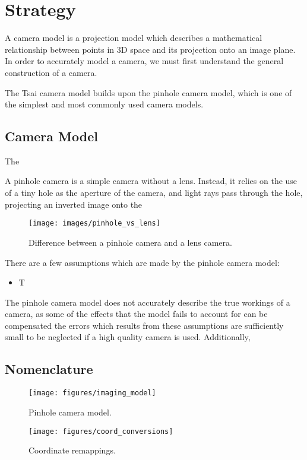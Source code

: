 \section{Strategy}

A camera model is a projection model which describes a mathematical relationship between points in 3D space and its projection onto an image plane. In order to accurately model a camera, we must first understand the general construction of a camera. 




The Tsai camera model builds upon the pinhole camera model, which is one of the simplest and most commonly used camera models.

\subsection{Camera Model}

The 

A pinhole camera is a simple camera without a lens. Instead, it relies on the use of a tiny hole as the aperture of the camera, and light rays pass through the hole, projecting an inverted image onto the 

\begin{figure}[h!]
    \centering
    \texttt{[image: images/pinhole\_vs\_lens]}
    \caption{Difference between a pinhole camera and a lens camera.}
\end{figure}



There are a few assumptions which are made by the pinhole camera model:
\begin{itemize}
    \item T
\end{itemize}

The pinhole camera model does not accurately describe the true workings of a camera, as some of the  effects that the model fails to account for can be compensated the errors which results from these assumptions are sufficiently small to be neglected if a high quality camera is used. Additionally,

\subsection{Nomenclature}

\begin{figure}[h!]
    \centering
    \texttt{[image: figures/imaging\_model]}
    \caption{Pinhole camera model.}
\end{figure}



\begin{figure}[h!]
    \centering
    \texttt{[image: figures/coord\_conversions]}
    \caption{Coordinate remappings.}
\end{figure}



